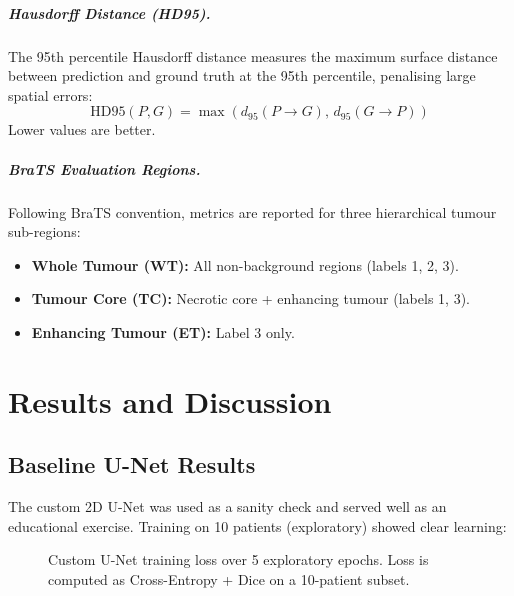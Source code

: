 \documentclass[12pt,a4paper]{report}
\begin{document}
\paragraph{Hausdorff Distance (HD95).}
The 95th percentile Hausdorff distance measures the maximum surface distance between prediction and ground truth at the 95th percentile, penalising large spatial errors:
\begin{equation}
\text{HD95}(P, G) = \max\left(d_{95}(P \to G),\, d_{95}(G \to P)\right)
\end{equation}
Lower values are better.

\paragraph{BraTS Evaluation Regions.}
Following BraTS convention, metrics are reported for three hierarchical tumour sub-regions:
\begin{itemize}
    \item \textbf{Whole Tumour (WT):} All non-background regions (labels 1, 2, 3).
    \item \textbf{Tumour Core (TC):} Necrotic core + enhancing tumour (labels 1, 3).
    \item \textbf{Enhancing Tumour (ET):} Label 3 only.
\end{itemize}

\chapter{Results and Discussion}

\section{Baseline U-Net Results}

The custom 2D U-Net was used as a sanity check and served well as an educational exercise. Training on 10 patients (exploratory) showed clear learning:

\begin{figure}[H]
\centering
{}
\caption{Custom U-Net training loss over 5 exploratory epochs. Loss is computed as Cross-Entropy + Dice on a 10-patient subset.}
\label{fig:unet_loss}
\end{figure}
\end{document}

